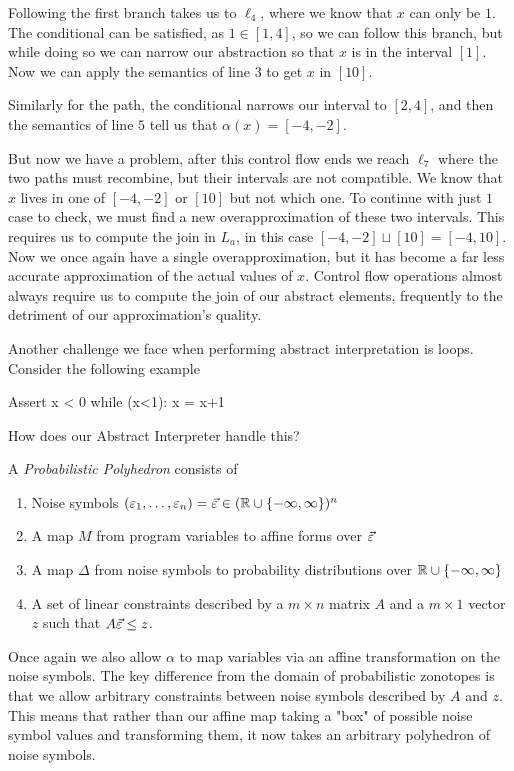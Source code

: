 Following the first branch takes us to $\ell_4$, where we know that $x$ can only be $1$.
The conditional can be satisfied, as $1 \in [1, 4]$, so we can follow this branch, but while doing so we can narrow our abstraction so that $x$ is in the interval $[1]$.
Now we can apply the semantics of line $3$ to get $x$ in $[10]$.

Similarly for the  path, the conditional narrows our interval to $[2, 4]$, and then the semantics of line $5$ tell us that $\alpha(x) = [-4, -2]$.

But now we have a problem, after this control flow ends we reach $\ell_7$ where the two paths must recombine, but their intervals are not compatible.
We know that $x$ lives in one of $[-4, -2]$ or $[10]$ but not which one.
To continue with just $1$ case to check, we must find a new overapproximation of these two intervals.
This requires us to compute the join in $L_a$, in this case $[-4, -2] \sqcup [10] = [-4, 10]$.
Now we once again have a single overapproximation, but it has become a far less accurate approximation of the actual values of $x$.
Control flow operations almost always require us to compute the join of our abstract elements, frequently to the detriment of our approximation's quality.

Another challenge we face when performing abstract interpretation is loops.
Consider the following example
\begin{code}
  Assert x < 0
  while (x<1):
    x = x+1 
\end{code}
How does our Abstract Interpreter handle this?


\begin{definition}
  A \emph{Probabilistic Polyhedron} consists of
  \begin{enumerate}
    \item Noise symbols $(\varepsilon_1, \ldots, \varepsilon_n) = \vec{\varepsilon} \in (\mathbb{R} \cup \{-\infty, \infty\})^n$
    \item A map $M$ from program variables to affine forms over $\vec{\varepsilon}$
    \item A map $\Delta$ from noise symbols to probability distributions over $\mathbb{R} \cup \{-\infty, \infty\}$
    \item A set of linear constraints described by a $m \times n$ matrix $A$ and a $m \times 1$ vector $z$ such that $A\vec{\varepsilon} \leq z$.
  \end{enumerate}
\end{definition}
Once again we also allow $\alpha$ to map variables via an affine transformation on the noise symbols.
The key difference from the domain of probabilistic zonotopes is that we allow arbitrary constraints between noise symbols described by $A$ and $z$.
This means that rather than our affine map taking a "box" of possible noise symbol values and transforming them, it now takes an arbitrary polyhedron of noise symbols.


